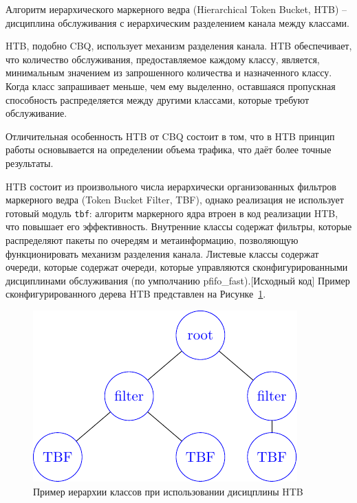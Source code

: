         Алгоритм иерархического маркерного ведра (Hierarchical Token Bucket, HTB) -- дисциплина
        обслуживания с иерархическим разделением канала между классами.

		HTB, подобно CBQ, использует механизм разделения канала. 
		HTB обеспечивает, что количество обслуживания, предоставляемое каждому классу, является,
		минимальным значением из запрошенного количества и назначенного классу. Когда класс
		запрашивает меньше, чем ему выделенно, оставшаяся пропускная способность распределяется между
		другими классами, которые требуют обслуживание.\cite{htb}

		Отличительная особенность HTB от CBQ состоит в том, что в HTB принцип работы
		основывается на определении объема трафика\cite{lartc}, что даёт более точные результаты.

		HTB состоит из произвольного числа иерархически организованных фильтров маркерного
        ведра (Token Bucket Filter, TBF)\cite{packethandling}, однако реализация не использует готовый
		модуль \texttt{tbf}: алгоритм маркерного ядра втроен в код реализации HTB,	
		что повышает его эффективность. Внутренние классы содержат фильтры, которые
		распределяют пакеты по очередям и метаинформацию, позволяющую функционировать
		механизм разделения канала. Листевые классы содержат очереди, которые содержат
		очереди, которые управляются сконфигурированными дисциплинами обслуживания (по
		умполчанию pfifo\_fast).[Исходный код] Пример сконфигурированного дерева HTB
		представлен на Рисунке~\ref{pic:htb_hier}.
		
        \begin{figure}[ht!]
            \center
            \includegraphics{./pdfimages/class_hierh_htb.pdf}
            \caption{Пример иерархии классов при использовании дисицплины HTB}
			\label{pic:htb_hier}
        \end{figure}

